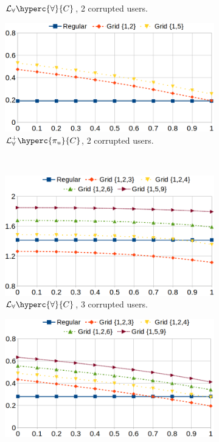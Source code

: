\begin{figure}[ht]
\begin{subfigure}[b]{0.45\linewidth}
\caption{$\mathcal{L}_\forall\hyperc{\forall}{C}$, 2 corrupted users.}
\end{subfigure}
\hfill
\centering
\begin{subfigure}[b]{0.45\linewidth}
\includegraphics[width=\textwidth]{figures/crowds-add-2.png}
\caption{$\mathcal{L}^+_\forall\hyperc{\pi_u}{C}$, 2 corrupted users.}
\end{subfigure}
\\ \vspace{3mm}
\begin{subfigure}[b]{0.45\linewidth}
\includegraphics[width=\textwidth]{figures/crowds-mult-3.png}
\caption{$\mathcal{L}_\forall\hyperc{\forall}{C}$, 3 corrupted users.}
\end{subfigure}
\hfill
\centering
\begin{subfigure}[b]{0.45\linewidth}
\includegraphics[width=\textwidth]{figures/crowds-add-3.png}

\end{subfigure}
\end{figure}
